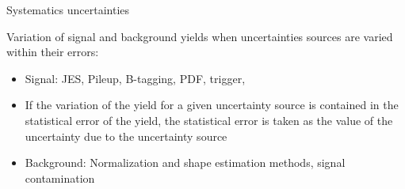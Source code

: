 \begin{frame}{Systematics uncertainties}
\vspace{-.2cm}

\begin{block}{}\tiny
Variation of signal and background yields when uncertainties sources are varied within their errors:
  \begin{itemize}
  \item Signal: JES, Pileup, B-tagging, PDF, trigger, 
  \item If the variation of the yield for a given uncertainty source is contained in the statistical error of the yield, the statistical error is taken as the value of the uncertainty due to the uncertainty source
  \item Background: Normalization and shape estimation methods, signal contamination 
  \end{itemize}
\end{block}

\begin{center}
\end{center}

\end{frame}



